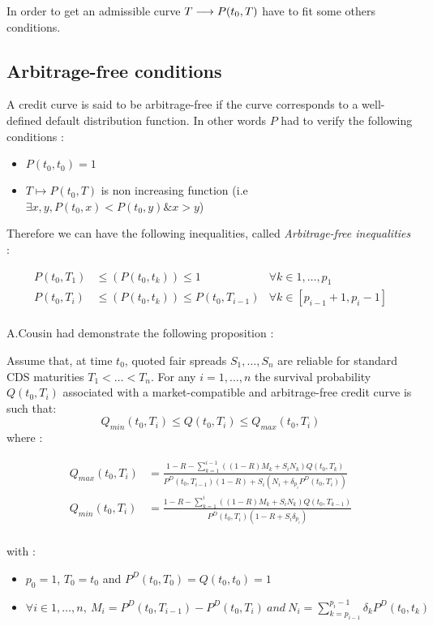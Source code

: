 In order to  get an admissible curve  $T \longrightarrow P(t_0,T)$ have to  fit some others
conditions. 

\subsection{Arbitrage-free conditions}
\label{sec:arbitr-free-cond}

\begin{de}
  A credit  curve is  said to be  arbitrage-free if the  curve corresponds  to a
  well-defined default distribution  function. In other words $P$  had to verify
  the following conditions :
  \begin{itemize}
  \item $P(t_0,t_0)=1$
  \item $T\longmapsto P(t_0,T)$ is non increasing function (i.e $\exists x,y, P(t_0,x)<P(t_0,y)\&x>y$)
  \end{itemize}
\end{de}

Therefore we can have  the following inequalities, called \textit{Arbitrage-free
  inequalities} :

\begin{align*}
  P(t_0,T_1) & \leq(P(t_0,t_k)) \leq 1 & \forall k \in 1,\dots,p_1 \\
  P(t_0,T_i) &\leq(P(t_0,t_k)) \leq P(t_0,T_{i-1}) & \forall k \in [p_{i-1}+1
  , p_i-1 ]\\
\end{align*}

A.Cousin had demonstrate the following proposition :
\begin{prop}
  Assume that, at  time $t_0$, quoted fair spreads  $S_1,\dots,S_n$ are reliable
  for  standard  CDS  maturities  $T_1<\dots<T_n.$  For  any  $i=1,\dots,n$  the
  survival  probability $Q(t_0,T_i)$  associated  with  a market-compatible  and
  arbitrage-free credit curve is such that:
  \[
  Q_{min}(t_0,T_i) \leq Q(t_0,T_i) \leq Q_{max}(t_0,T_i)
  \]
  where :

  \begin{eqnarray*}
    Q_{max}(t_0,T_i) & =\frac
    {1 - R - \sum^{i - 1}_{k=1}( (1 - R) M_k + S_i N_k) Q(t_0,T_{k})}
    {P^D(t_0,T_{i - 1})(1 - R) + S_i(N_i + \delta_{p_i}P^D(t_0,T_i))}\\
    Q_{min}(t_0,T_i) &  =\frac{1 - R  - \sum^i_{k=1}  ( (1 -  R) M_k +  S_i N_k)
      Q(t_0,T_{k -1})}{P^D(t_0,T_{i})(1 - R + S_i \delta_{p_i})}\\
  \end{eqnarray*}

with :
\begin{itemize}
\item $p_0=1$, $T_0=t_0$ and $P^D(t_0,T_0)=Q(t_0,t_0)=1$
\item $\forall  i \in 1,\dots,n,\ M_i=P^D(t_0,T_{i-1})-P^D(t_0,T_i)\  and\ N_i =
  \sum^{p_i-1}_{k=p_{i-1}} \delta_k P^D(t_0,t_k)$ 
\end{itemize}
\end{prop}

